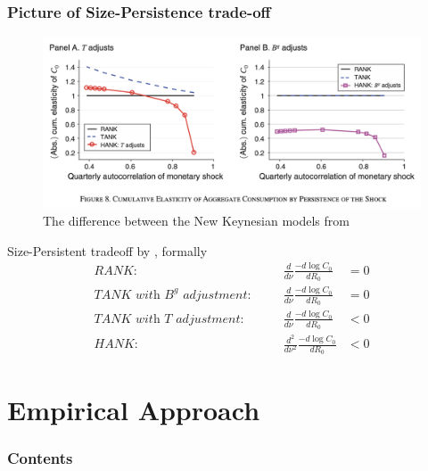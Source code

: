 \documentclass[11pt,pdf,aspectratio=129]{beamer}
\begin{document}
\begin{frame}\frametitle{Picture of Size-Persistence trade-off}
    \begin{figure}\centering
        \includegraphics[scale=0.47]{Size_Persistence_KMV.png}
        \caption{The difference between the New Keynesian models from \citet{KMV2018}}
    \end{figure}
\end{frame}


\begin{frame}{Size-Persistent tradeoff by \citet{KMV2018}, formally}
    \begin{align}
        \textit{RANK:}&\quad& \frac{d}{d\nu}\frac{-d\log C_0}{dR_0}&=0     \label{eq:SizePersistenceRANK}\\
    \textit{TANK with $B^g$ adjustment:}&\quad& \frac{d}{d\nu}\frac{-d\log C_0}{dR_0}&= 0     \label{eq:SizePersistenceTANK_B}\\
    \textit{TANK with $T$ adjustment:}&\quad& \frac{d}{d\nu}\frac{-d\log C_0}{dR_0}&< 0     \label{eq:SizePersistenceTANK_T}\\
    \textit{HANK:}& \quad& 
        \frac{d^2}{d\nu ^2}\frac{-d\log C_0}{dR_0}&<0
        \label{eq:SizePersistenceHANK}
    \end{align}
    
\end{frame}


\section{Empirical Approach}
\begin{frame}
    \frametitle{Contents}
    \tableofcontents[currentsection]
\end{frame}
\end{document}
